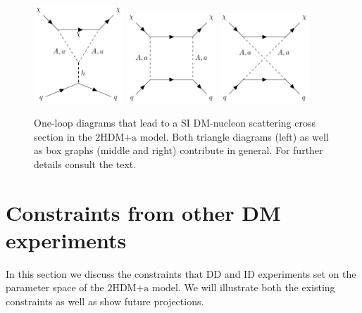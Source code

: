 \documentclass[review]{elsarticle}
\newcommand{\hdma}{\ensuremath{\textrm{2HDM+a}}\xspace}
\begin{document}

\begin{figure}[t!]
    \centering
    \includegraphics[width=0.3\textwidth]{pseudoTriangle.pdf} \quad 
    \includegraphics[width=0.3\textwidth]{pseudoBox.pdf} \quad 
    \includegraphics[width=0.3\textwidth]{pseudoBox2.pdf} 
    \vspace{4mm}
    \caption{One-loop diagrams that lead to a SI DM-nucleon scattering cross section in the \hdma model.  Both triangle diagrams (left) as well as box graphs (middle and right) contribute in general. For further details consult the text. }
    \label{fig:feynDDPS}
\end{figure}

\section{Constraints from other DM experiments}
\label{sec:DMdetection}

In this section we  discuss the constraints that DD and ID experiments set on the parameter space of the \hdma model. We will illustrate both the existing constraints as well as show future projections. 
\end{document}
